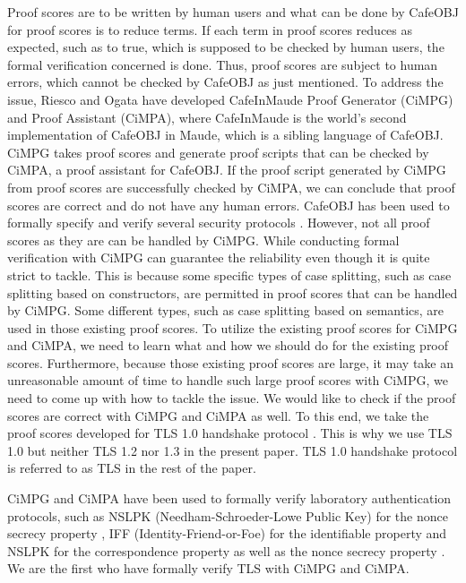 \documentclass[a4paper,fleqn]{cas-dc}
\begin{document}
Proof scores are to be written by human users and what can be done by CafeOBJ for proof scores is to reduce terms. If each term in proof scores reduces as expected, such as to true, which is supposed to be checked by human users, the formal verification concerned is done. Thus, proof scores are subject to human errors, which cannot be checked by CafeOBJ as just mentioned. To address the issue, Riesco and Ogata \cite{RiescoO18tosem} have developed CafeInMaude Proof Generator (CiMPG) and Proof Assistant (CiMPA), where CafeInMaude is the world's second implementation of CafeOBJ in Maude, which is a sibling language of CafeOBJ. CiMPG takes proof scores and generate proof scripts that can be checked by CiMPA, a proof assistant for CafeOBJ. If the proof script generated by CiMPG from proof scores are successfully checked by CiMPA, we can conclude that proof scores are correct and do not have any human errors. CafeOBJ has been used to formally specify and verify several security protocols \cite{10.5555/1765533.1765569, 10.5555/646542.696196, 1357944, 1437139}. However, not all proof scores as they are can be handled by CiMPG. While conducting formal verification with CiMPG can guarantee the reliability even though it is quite strict to tackle. This is because some specific types of case splitting, such as case splitting based on constructors, are permitted in proof scores that can be handled by CiMPG. Some different types, such as case splitting based on semantics, are used in those existing proof scores. To utilize the existing proof scores for CiMPG and CiMPA, we need to learn what and how we should do for the existing proof scores. Furthermore, because those existing proof scores are large, it may take an unreasonable amount of time to handle such large proof scores with CiMPG, we need to come up with how to tackle the issue. We would like to check if the proof scores are correct with CiMPG and CiMPA as well. To this end, we take the proof scores developed for TLS 1.0 handshake protocol \cite{1437139}. This is why we use TLS 1.0 but neither TLS 1.2 nor 1.3 in the present paper. TLS 1.0 handshake protocol is referred to as TLS in the rest of the paper.

CiMPG and CiMPA have been used to formally verify laboratory authentication protocols, such as NSLPK (Needham-Schroeder-Lowe Public Key) for the nonce secrecy property \cite{RiescoO18tosem}, IFF (Identity-Friend-or-Foe) for the identifiable property \cite{twmon} and NSLPK for the correspondence property as well as the nonce secrecy property \cite{twmon}. We are the first who have formally verify TLS with CiMPG and CiMPA.
\end{document}

